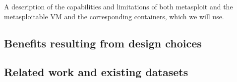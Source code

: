\documentclass{article}
\begin{document}
A description of the capabilities and limitations of both metasploit and the metasploitable VM and the corresponding containers, which we will use.







\subsection{Benefits resulting from design choices}

















\subsection{Related work and existing datasets}

\end{document}

